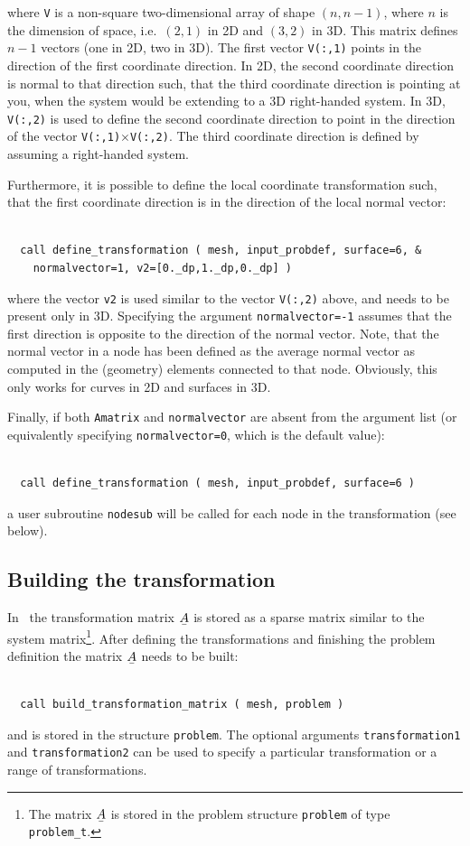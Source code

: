 where \texttt{V} is a non-square two-dimensional array of shape $(n,n-1)$,
where $n$ is the dimension of space, i.e.\ $(2,1)$ in 2D and $(3,2)$ in 3D. This
matrix defines $n-1$ vectors (one in 2D, two in 3D). The first vector 
\texttt{V(:,1)} points in the direction of the first coordinate direction. In
2D, the second coordinate direction is normal to that direction such, that the third coordinate
direction is pointing at you, when the system would be extending to a
3D right-handed system. 
In 3D, \texttt{V(:,2)} is used to define the second coordinate direction to
point in the direction of the vector \texttt{V(:,1)}$\times$\texttt{V(:,2)}.
The third coordinate direction is defined by assuming a right-handed system.

Furthermore, it is possible to define the local coordinate transformation such,
that the first coordinate direction is in the direction of the local normal
vector:
\begin{verbatim}

  call define_transformation ( mesh, input_probdef, surface=6, & 
    normalvector=1, v2=[0._dp,1._dp,0._dp] )

\end{verbatim}
where the vector \texttt{v2} is used similar to the vector \texttt{V(:,2)} 
above, and needs to be present only in 3D. Specifying the argument
\texttt{normalvector=-1} assumes that the first direction is opposite to the direction of the
normal vector. Note, that the normal vector in a node has been defined as the average
normal vector as computed in the (geometry) elements connected to that node. Obviously, this only
works for curves in 2D and surfaces in 3D.

Finally, if both \texttt{Amatrix} and \texttt{normalvector} are absent from the
argument list (or equivalently specifying \texttt{normalvector=0}, which is the default
value):
\begin{verbatim}

  call define_transformation ( mesh, input_probdef, surface=6 )

\end{verbatim}
a user subroutine \texttt{nodesub} will be called for each node in the
transformation (see below).

\subsection{Building the transformation}

In \tfem\ the transformation matrix $\mat A$ is stored as a sparse matrix
similar to the system matrix\footnote{The matrix $\mat A$ is stored in the
problem structure \texttt{problem} of type \texttt{problem\_t}.}.
After defining the transformations and finishing the problem definition the
matrix $\mat A$ needs to be built:
\begin{verbatim}

  call build_transformation_matrix ( mesh, problem )

\end{verbatim}
and is stored in the structure \texttt{problem}. The optional arguments \texttt{transformation1} and
\texttt{transformation2} can be used to specify a particular transformation or a range of transformations.

